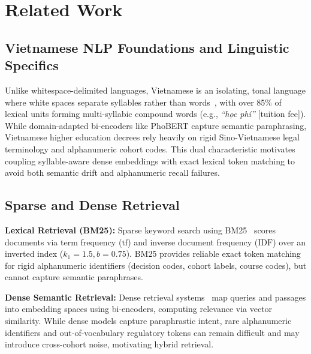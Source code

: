 \section{Related Work}
\label{sec:related}



\subsection{Vietnamese NLP Foundations and Linguistic Specifics}
\label{sec:vietnamese_nlp}

Unlike whitespace-delimited languages, Vietnamese is an isolating, tonal language where white spaces separate syllables rather than words~\cite{nguyen2020phobert}, with over 85\% of lexical units forming multi-syllabic compound words (e.g., \textit{``h\d{o}c ph\'i''} [tuition fee]). While domain-adapted bi-encoders like PhoBERT capture semantic paraphrasing, Vietnamese higher education decrees rely heavily on rigid Sino-Vietnamese legal terminology and alphanumeric cohort codes. This dual characteristic motivates coupling syllable-aware dense embeddings with exact lexical token matching to avoid both semantic drift and alphanumeric recall failures.

\subsection{Sparse and Dense Retrieval}
\label{sec:sparse_dense}

\textbf{Lexical Retrieval (BM25):} Sparse keyword search using BM25~\cite{robertson2009bm25} scores documents via term frequency ($\mathrm{tf}$) and inverse document frequency ($\mathrm{IDF}$) over an inverted index ($k_1 = 1.5, b = 0.75$). BM25 provides reliable exact token matching for rigid alphanumeric identifiers (decision codes, cohort labels, course codes), but cannot capture semantic paraphrases.

\textbf{Dense Semantic Retrieval:} Dense retrieval systems~\cite{karpukhin2020dpr,lewis2020rag} map queries and passages into embedding spaces using bi-encoders, computing relevance via vector similarity. While dense models capture paraphrastic intent, rare alphanumeric identifiers and out-of-vocabulary regulatory tokens can remain difficult and may introduce cross-cohort noise, motivating hybrid retrieval.

